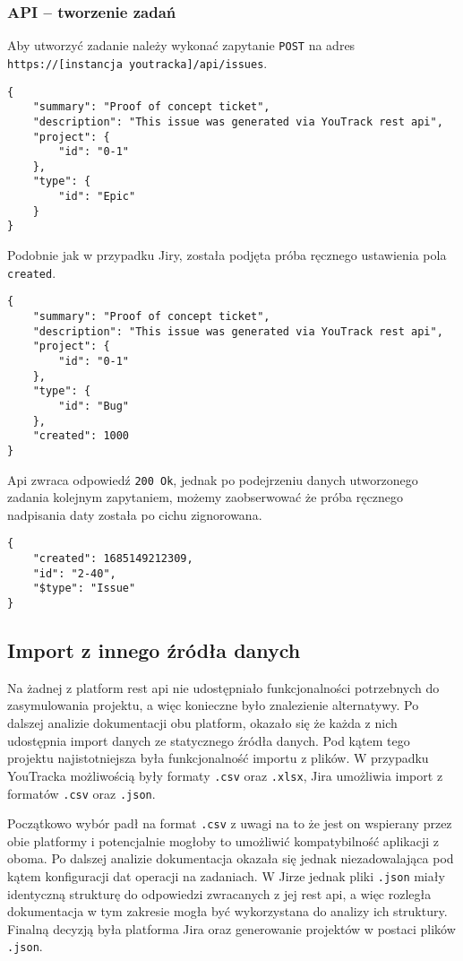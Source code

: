 \subsubsection*{API -- tworzenie zadań}
Aby utworzyć zadanie należy wykonać zapytanie \texttt{POST} na adres \texttt{https://[instancja youtracka]/api/issues}.
\begin{lstlisting}[caption=Przykładowe zapytanie do stworzenia zadania (YouTrack)]
{  
    "summary": "Proof of concept ticket",  
    "description": "This issue was generated via YouTrack rest api",  
    "project": {  
        "id": "0-1"  
    },  
    "type": {  
        "id": "Epic"  
    }  
}
\end{lstlisting}
Podobnie jak w przypadku Jiry, została podjęta próba ręcznego ustawienia pola \texttt{created}.
\begin{lstlisting}[caption=Próba ustawienia daty stworzenia zadania (YouTrack)]
{
	"summary": "Proof of concept ticket",
	"description": "This issue was generated via YouTrack rest api",
	"project": {
		"id": "0-1"
	},
	"type": {
		"id": "Bug"
	},
	"created": 1000
}
\end{lstlisting}
Api zwraca odpowiedź \texttt{200 Ok}, jednak po podejrzeniu danych utworzonego zadania kolejnym zapytaniem,
możemy zaobserwować że próba ręcznego nadpisania daty została po cichu zignorowana.
\begin{lstlisting}[caption=Dane zadania z "ustawioną" datą (YouTrack)]
{
    "created": 1685149212309,
    "id": "2-40",
    "$type": "Issue"
}
\end{lstlisting}

\subsection*{Import z innego źródła danych}
Na żadnej z platform rest api nie udostępniało funkcjonalności potrzebnych do zasymulowania projektu, a więc konieczne
było znalezienie alternatywy.
Po dalszej analizie dokumentacji obu platform, okazało się że każda z nich udostępnia import danych ze statycznego źródła danych. \cite[]{JiraImportDocumentation} \cite[]{YouTrackImportDocumentation}
Pod kątem tego projektu najistotniejsza była funkcjonalność importu z plików.
W przypadku YouTracka możliwością były formaty \texttt{.csv} oraz \texttt{.xlsx}, Jira umożliwia
import z formatów \texttt{.csv} oraz \texttt{.json}.

Początkowo wybór padł na format \texttt{.csv} z uwagi na to że jest on wspierany przez obie platformy i potencjalnie
mogłoby to umożliwić kompatybilność aplikacji z oboma. Po dalszej analizie dokumentacja okazała się jednak niezadowalająca
pod kątem konfiguracji dat operacji na zadaniach.
W Jirze jednak pliki \texttt{.json} miały identyczną strukturę do odpowiedzi zwracanych z jej rest api, a więc
rozległa dokumentacja w tym zakresie mogła być wykorzystana do analizy ich struktury.\\
Finalną decyzją była platforma Jira oraz generowanie projektów w postaci plików \texttt{.json}.

